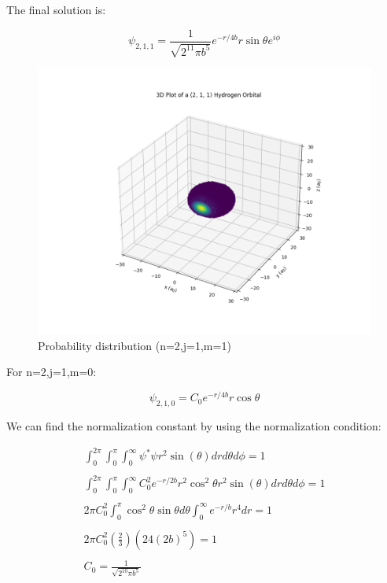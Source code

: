 The final solution is:

\begin{equation}
  \psi_{2,1,1} = \frac{1}{\sqrt{2^{11}\pi b^5}} e^{-r/4b} r \sin\theta e^{i\phi}
\end{equation}

\begin{figure}
  \centering
  \includegraphics{images9/3d_plot_2,1,1.png}
  \caption{Probability distribution (n=2,j=1,m=1)}
\end{figure}

For n=2,j=1,m=0:

\begin{equation}
  \psi_{2,1,0} = C_0 e^{-r/4b} r \cos\theta
\end{equation}

We can find the normalization constant by using the normalization condition:

\begin{equation}
\begin{array}{c}
  \int_{0}^{2\pi}\int_{0}^{\pi}\int_{0}^{\infty} \psi^*\psi r^2 \sin(\theta) dr d\theta d\phi = 1
  \\

  \\
  \int_{0}^{2\pi}\int_{0}^{\pi}\int_{0}^{\infty} C_0^2 e^{-r/2b} r^2 \cos^2\theta r^2 \sin(\theta) dr d\theta d\phi = 1
  \\

  \\
  2 \pi C_0^2\int_{0}^{\pi}\cos^2\theta\sin\theta d\theta \int_{0}^{\infty} e^{-r/b} r^4 dr = 1
  \\

  \\
  2 \pi C_0^2 (\frac{2}{3}) (24(2b)^5) = 1
  \\

  \\
  C_0 = \frac{1}{\sqrt{2^{10}\pi b^5}}
\end{array}
\end{equation}

